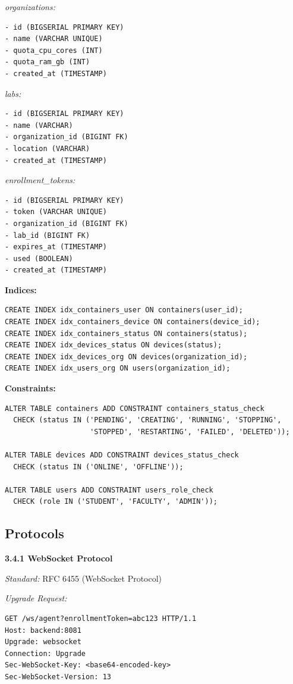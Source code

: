 \documentclass[12pt,a4paper]{article}
\begin{document}
\textit{organizations:}
\begin{verbatim}
- id (BIGSERIAL PRIMARY KEY)
- name (VARCHAR UNIQUE)
- quota_cpu_cores (INT)
- quota_ram_gb (INT)
- created_at (TIMESTAMP)
\end{verbatim}

\textit{labs:}
\begin{verbatim}
- id (BIGSERIAL PRIMARY KEY)
- name (VARCHAR)
- organization_id (BIGINT FK)
- location (VARCHAR)
- created_at (TIMESTAMP)
\end{verbatim}

\textit{enrollment\_tokens:}
\begin{verbatim}
- id (BIGSERIAL PRIMARY KEY)
- token (VARCHAR UNIQUE)
- organization_id (BIGINT FK)
- lab_id (BIGINT FK)
- expires_at (TIMESTAMP)
- used (BOOLEAN)
- created_at (TIMESTAMP)
\end{verbatim}

\textbf{Indices:}
\begin{verbatim}
CREATE INDEX idx_containers_user ON containers(user_id);
CREATE INDEX idx_containers_device ON containers(device_id);
CREATE INDEX idx_containers_status ON containers(status);
CREATE INDEX idx_devices_status ON devices(status);
CREATE INDEX idx_devices_org ON devices(organization_id);
CREATE INDEX idx_users_org ON users(organization_id);
\end{verbatim}

\textbf{Constraints:}
\begin{verbatim}
ALTER TABLE containers ADD CONSTRAINT containers_status_check
  CHECK (status IN ('PENDING', 'CREATING', 'RUNNING', 'STOPPING', 
                    'STOPPED', 'RESTARTING', 'FAILED', 'DELETED'));

ALTER TABLE devices ADD CONSTRAINT devices_status_check
  CHECK (status IN ('ONLINE', 'OFFLINE'));

ALTER TABLE users ADD CONSTRAINT users_role_check
  CHECK (role IN ('STUDENT', 'FACULTY', 'ADMIN'));
\end{verbatim}

\subsection{Protocols}

\textbf{3.4.1 WebSocket Protocol}

\textit{Standard:} RFC 6455 (WebSocket Protocol)

\textit{Upgrade Request:}
\begin{verbatim}
GET /ws/agent?enrollmentToken=abc123 HTTP/1.1
Host: backend:8081
Upgrade: websocket
Connection: Upgrade
Sec-WebSocket-Key: <base64-encoded-key>
Sec-WebSocket-Version: 13
\end{verbatim}
\end{document}
